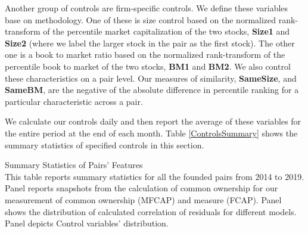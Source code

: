 %				


Another group of controls are firm-specific controls.  We define these variables base on  \cite{AntonPolk} methodology. One of these is size control based on the normalized rank-transform of the percentile market capitalization of the two stocks, \textbf{Size1} and \textbf{Size2} (where we label the
larger stock in the pair as the first stock). The other one is a book to market ratio based on the normalized rank-transform of the percentile book to market of the two stocks, \textbf{BM1} and \textbf{BM2}.
We also control these characteristics on a pair level. Our measures of similarity, \textbf{SameSize}, and \textbf{SameBM}, are the negative of the absolute difference in percentile ranking for a particular characteristic across a pair.


We calculate our controls daily and then report the average of these variables for the entire period at the end of each month. Table \ref{ControlsSummary} shows the summary statistics of specified controls in this section.


	\captionsetup[subtable]{labelformat=parens}
			\begin{table}[htbp]
			\caption{Summary Statistics of Pairs' Features\\
			This table reports summary statistics for all the founded pairs from 2014 to 2019. Panel  reports snapshots from the calculation of common ownership for our measurement of common ownership (MFCAP) and \cite{AntonPolk} measure (FCAP). Panel  shows the distribution of calculated correlation of residuals for different models. Panel depicts Control variables' distribution.
			}
				\label{measureResults}
				\resizebox{1\textwidth}{!}
				{
						{}
				}
				\bigskip
		\centering
		\label{tCorr}
		\resizebox{1\textwidth}{!}
		{
			
		}
		
						\bigskip
					
 \label{ControlsSummary}
               \centering 
               	\resizebox{1\textwidth}{!}
                 {
    
                 }
             \end{table}


